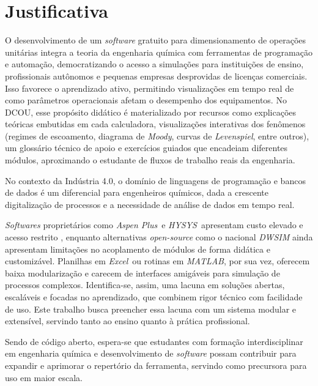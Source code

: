 \chapter{Justificativa}

O desenvolvimento de um \textit{software} gratuito para dimensionamento de operações unitárias integra a teoria da engenharia química com ferramentas de programação e automação, democratizando o acesso a simulações para instituições de ensino, profissionais autônomos e pequenas empresas desprovidas de licenças comerciais. Isso favorece o aprendizado ativo, permitindo visualizações em tempo real de como parâmetros operacionais afetam o desempenho dos equipamentos. No DCOU, esse propósito didático é materializado por recursos como explicações teóricas embutidas em cada calculadora, visualizações interativas dos fenômenos (regimes de escoamento, diagrama de \textit{Moody}, curvas de \textit{Levenspiel}, entre outros), um glossário técnico de apoio e exercícios guiados que encadeiam diferentes módulos, aproximando o estudante de fluxos de trabalho reais da engenharia.

No contexto da Indústria 4.0, o domínio de linguagens de programação e bancos de dados é um diferencial para engenheiros químicos, dada a crescente digitalização de processos e a necessidade de análise de dados em tempo real.

\textit{Softwares} proprietários como \textit{Aspen Plus}\textregistered\ e \textit{HYSYS}\textregistered\ apresentam custo elevado e acesso restrito \cite{aspen2025, alves2022}, enquanto alternativas \textit{open-source} como o nacional \textit{DWSIM} \cite{dwsim2025} ainda apresentam limitações no acoplamento de módulos de forma didática e customizável. Planilhas em \textit{Excel}\textregistered\ ou rotinas em \textit{MATLAB}\textregistered, por sua vez, oferecem baixa modularização e carecem de interfaces amigáveis para simulação de processos complexos. Identifica-se, assim, uma lacuna em soluções abertas, escaláveis e focadas no aprendizado, que combinem rigor técnico com facilidade de uso. Este trabalho busca preencher essa lacuna com um sistema modular e extensível, servindo tanto ao ensino quanto à prática profissional.

Sendo de código aberto, espera-se que estudantes com formação interdisciplinar em engenharia química e desenvolvimento de \textit{software} possam contribuir para expandir e aprimorar o repertório da ferramenta, servindo como precursora para uso em maior escala.
